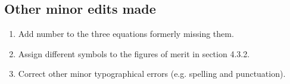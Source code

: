 \documentclass[a4paper,11pt]{article}
\begin{document}
\section{}
\subsection*{Other minor edits made}
\begin{enumerate}
  \item Add number to the three equations formerly missing them.
  \item Assign different symbols to the figures of merit in section 4.3.2.
  \item Correct other minor typographical errors (e.g. spelling and
        punctuation).
\end{enumerate}



\end{document}

